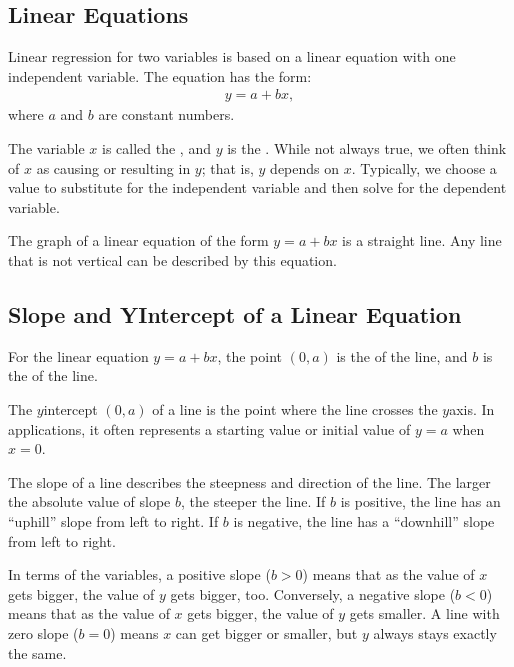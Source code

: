 \documentclass[letterpaper,10pt,english]{jupyterBook}
\begin{document}
\subsection{Linear Equations}
\label{\detokenize{Ch8 Correlation and Linear Regression/8.2 Linear Equations:id1}}
\sphinxAtStartPar
Linear regression for two variables is based on a linear equation with one independent variable. The equation has the form:
\begin{equation*}
\begin{split}y = a + bx, \end{split}
\end{equation*}
\sphinxAtStartPar
where \(a\) and \(b\) are constant numbers.

\sphinxAtStartPar
The variable \(x\) is called the , and \(y\) is the . While not always true, we often think of \(x\) as causing or resulting in \(y\); that is, \(y\) depends on \(x\). Typically, we choose a value to substitute for the independent variable and then solve for the dependent variable.

\sphinxAtStartPar
The graph of a linear equation of the form \(y = a + bx\) is a straight line. Any line that is not vertical can be described by this equation.


\subsection{Slope and Y\sphinxhyphen{}Intercept of a Linear Equation}
\label{\detokenize{Ch8 Correlation and Linear Regression/8.2 Linear Equations:slope-and-y-intercept-of-a-linear-equation}}
\sphinxAtStartPar
For the linear equation \(y = a + bx\), the point \((0, a)\) is the  of the line, and \(b\) is the  of the line.

\sphinxAtStartPar
The \(y\)\sphinxhyphen{}intercept \((0, a)\) of a line is the point where the line crosses the \(y\)\sphinxhyphen{}axis. In applications, it often represents a starting value or initial value of \(y = a\) when \(x = 0\).

\sphinxAtStartPar
The slope of a line describes the steepness and direction of the line. The larger the absolute value of slope \(b\), the steeper the line. If \(b\) is positive, the line has an “uphill” slope from left to right. If \(b\) is negative, the line has a “downhill” slope from left to right.

\sphinxAtStartPar
In terms of the variables, a positive slope (\(b > 0\)) means that as the value of \(x\) gets bigger, the value of \(y\) gets bigger, too. Conversely, a negative slope (\(b < 0\)) means that as the value of \(x\) gets bigger, the value of \(y\) gets smaller. A line with zero slope (\(b = 0\)) means \(x\) can get bigger or smaller, but \(y\) always stays exactly the same.
\end{document}
